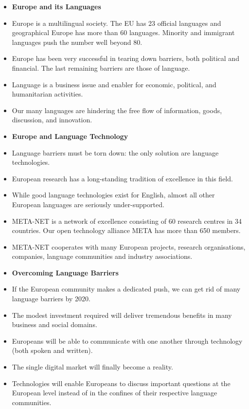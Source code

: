 \documentclass[10pt, plain]{../../metanetpaper}
\begin{document}
\vspace*{-6mm}
\begin{multicols}{2}
  \begin{itemize}
  \item[] \textbf{Europe and its Languages}
  \item Europe is a multilingual society. The EU has 23 official languages and geographical Europe has more than 60 languages. Minority and immigrant languages push the number well beyond 80.
  \item Europe has been very successful in tearing down barriers, both political and financial. The last remaining barriers are those of language.
  \item Language is a business issue and enabler for economic, political, and humanitarian activities.
  \item Our many languages are hindering the free flow of information, goods, discussion, and innovation.
  \item[] \textbf{Europe and Language Technology}
  \item Language barriers must be torn down: the only solution are language technologies.
  \item European research has a long-standing tradition of excellence in this field.
  \item While good language technologies exist for English, almost all other European languages are seriously under-supported.
  \item META-NET is a network of excellence consisting of 60 research centres in 34 countries. Our open technology alliance META has more than 650 members.
  \item META-NET cooperates with many European projects, research organisations, companies, language communities and industry associations.
  \item[] \textbf{Overcoming Language Barriers}
  \item If the European community makes a dedicated push, we can get rid of many language barriers by 2020.
  \item The modest investment required will deliver tremendous benefits in many business and social domains.
  \item Europeans will be able to communicate with one another through technology (both spoken and written).
  \item The single digital market will finally become a reality.
  \item Technologies will enable Europeans to discuss important questions at the European level instead of in the confines of their respective language communities.

\end{itemize}
\end{multicols}
\end{document}
